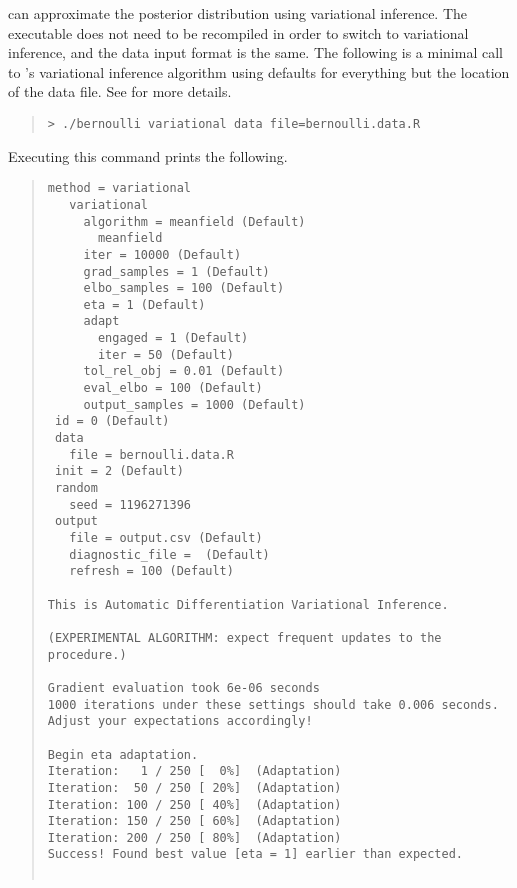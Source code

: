 \CmdStan can approximate the posterior distribution using variational
inference. The executable does not need to be
recompiled in order to switch to variational inference, and the
data input format is the same. The following is a minimal call to
\Stan's variational inference algorithm using defaults for everything but the
location of the data file. See  for more
details.
%
\begin{quote}
\begin{Verbatim}[fontshape=sl]
> ./bernoulli variational data file=bernoulli.data.R
\end{Verbatim}
\end{quote}
%
Executing this command prints the following.
%
\begin{quote}
\begin{Verbatim}[fontsize=\footnotesize]
 method = variational
   variational
     algorithm = meanfield (Default)
       meanfield
     iter = 10000 (Default)
     grad_samples = 1 (Default)
     elbo_samples = 100 (Default)
     eta = 1 (Default)
     adapt
       engaged = 1 (Default)
       iter = 50 (Default)
     tol_rel_obj = 0.01 (Default)
     eval_elbo = 100 (Default)
     output_samples = 1000 (Default)
 id = 0 (Default)
 data
   file = bernoulli.data.R
 init = 2 (Default)
 random
   seed = 1196271396
 output
   file = output.csv (Default)
   diagnostic_file =  (Default)
   refresh = 100 (Default)

This is Automatic Differentiation Variational Inference.

(EXPERIMENTAL ALGORITHM: expect frequent updates to the procedure.)

Gradient evaluation took 6e-06 seconds
1000 iterations under these settings should take 0.006 seconds.
Adjust your expectations accordingly!

Begin eta adaptation.
Iteration:   1 / 250 [  0%]  (Adaptation)
Iteration:  50 / 250 [ 20%]  (Adaptation)
Iteration: 100 / 250 [ 40%]  (Adaptation)
Iteration: 150 / 250 [ 60%]  (Adaptation)
Iteration: 200 / 250 [ 80%]  (Adaptation)
Success! Found best value [eta = 1] earlier than expected.


\end{Verbatim}
\end{quote}
